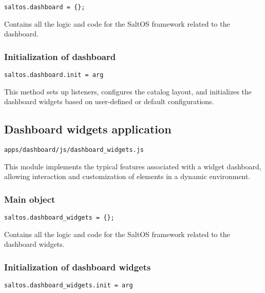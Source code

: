 \documentclass[a4paper]{article}
\begin{document}
\begin{lstlisting}
saltos.dashboard = {};
\end{lstlisting}

Contains all the logic and code for the SaltOS framework related to the dashboard.

\hypertarget{toc40}{}
\subsubsection{Initialization of dashboard}

\begin{lstlisting}
saltos.dashboard.init = arg
\end{lstlisting}

This method sets up listeners, configures the catalog layout, and initializes
the dashboard widgets based on user-defined or default configurations.

\hypertarget{toc41}{}
\subsection{Dashboard widgets application}

\begin{lstlisting}
apps/dashboard/js/dashboard_widgets.js
\end{lstlisting}

This module implements the typical features associated with a widget dashboard,
allowing interaction and customization of elements in a dynamic environment.

\hypertarget{toc42}{}
\subsubsection{Main object}

\begin{lstlisting}
saltos.dashboard_widgets = {};
\end{lstlisting}

Contains all the logic and code for the SaltOS framework related to the dashboard widgets.

\hypertarget{toc43}{}
\subsubsection{Initialization of dashboard widgets}

\begin{lstlisting}
saltos.dashboard_widgets.init = arg
\end{lstlisting}
\end{document}
